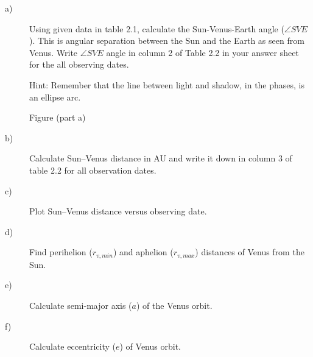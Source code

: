 \begin{description}
\item[a)] Using given data in table 2.1, calculate the Sun-Venus-Earth angle
  ($\angle SVE$). This is angular separation between the Sun and the Earth as
  seen from Venus. Write $\angle SVE$ angle in column 2 of Table 2.2 in your
  answer sheet for the all observing dates.

  Hint: Remember that the line between light and shadow, in the phases, is an
  ellipse arc.

\begin{center}
Figure (part a)
\end{center}

\item[b)] Calculate Sun--Venus distance in AU and write it down in column 3
  of table 2.2 for all observation dates.
\item[c)] Plot Sun--Venus distance versus observing date.
\item[d)] Find perihelion ($r_{v,min}$) and aphelion ($r_{v,max}$) distances
  of Venus from the Sun.
\item[e)] Calculate semi-major axis ($a$) of the Venus orbit.
\item[f)] Calculate eccentricity ($e$) of Venus orbit.
\end{description}
